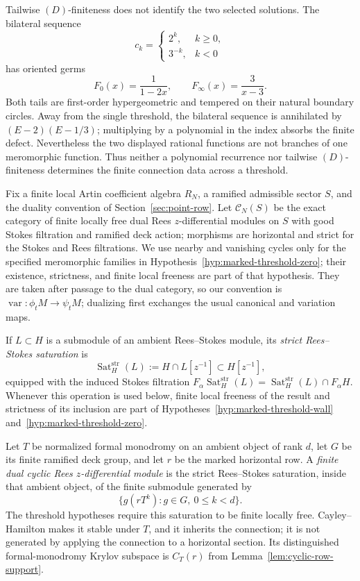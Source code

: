 \begin{remark}
\label{rem:two-tail-threshold-obstruction}
Tailwise \((D)\)-finiteness does not identify the two selected solutions.  The
bilateral sequence
\[
 c_k=\begin{cases}2^k,&k\geq0,\\3^{-k},&k<0\end{cases}
\]
has oriented germs
\[
 F_0(x)=\frac1{1-2x},\qquad F_\infty(x)=\frac3{x-3}.
\]
Both tails are first-order hypergeometric and tempered on their natural
boundary circles.  Away from the single threshold, the bilateral sequence
is annihilated by \((E-2)(E-1/3)\); multiplying by a polynomial in the index
absorbs the finite defect.  Nevertheless the two displayed rational
functions are not branches of one meromorphic function.  Thus neither a
polynomial recurrence nor tailwise \((D)\)-finiteness determines the finite
connection data across a threshold.
\end{remark}

Fix a finite local Artin coefficient algebra \(R_N\), a ramified admissible
sector \(S\), and the duality convention of Section~\ref{sec:point-row}.  Let
\(\mathcal C_N(S)\) be the exact category of finite locally free dual Rees
\(z\)-differential modules on \(S\) with good Stokes filtration and ramified
deck action; morphisms are horizontal and strict for the Stokes and Rees
filtrations.  We use nearby and vanishing cycles only for the specified
meromorphic families in Hypothesis~\ref{hyp:marked-threshold-zero}; their
existence, strictness, and finite local freeness are part of that hypothesis.  They are
taken after passage to the dual category, so our convention is
\(\operatorname{var}:\phi_tM\to\psi_tM\); dualizing first exchanges the
usual canonical and variation maps.

\begin{definition}
\label{def:finite-dual-cyclic-rees}
If \(L\subset H\) is a submodule of an ambient Rees--Stokes module, its
\emph{strict Rees--Stokes saturation} is
\[
 \operatorname{Sat}^{\mathrm{str}}_H(L)
 :=H\cap L[z^{-1}]\subset H[z^{-1}],
\]
equipped with the induced Stokes filtration
\(F_\alpha\operatorname{Sat}^{\mathrm{str}}_H(L)
=\operatorname{Sat}^{\mathrm{str}}_H(L)\cap F_\alpha H\).
Whenever this operation is used below, finite local freeness of the result and
strictness of its inclusion are part of
Hypotheses~\ref{hyp:marked-threshold-wall}
and~\ref{hyp:marked-threshold-zero}.

Let \(T\) be normalized formal monodromy on an ambient object of rank \(d\),
let \(G\) be its finite ramified deck group, and let \(r\) be the marked
horizontal row.  A \emph{finite dual cyclic Rees \(z\)-differential module}
is the strict Rees--Stokes saturation, inside that ambient object, of the
finite submodule generated by
\[
 \{g(rT^k):g\in G,\ 0\leq k<d\}.
\]
The threshold hypotheses require this saturation to be finite locally free.
Cayley--Hamilton makes it stable under \(T\), and it inherits the connection;
it is not generated by applying the connection to a horizontal section.  Its
distinguished formal-monodromy Krylov subspace is \(C_T(r)\) from
Lemma~\ref{lem:cyclic-row-support}.
\end{definition}

